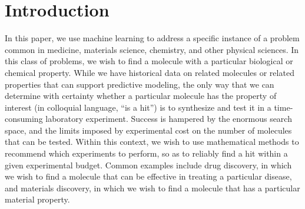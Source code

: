 \documentclass[opre,nonblindrev]{informs3} %
\begin{document}
%


\section{Introduction}

In this paper, we use machine learning to address a specific instance of a problem common in medicine, materials science, chemistry, and other physical sciences.  In this class of problems, we wish to find a molecule with a particular biological or chemical property. While we have historical data on related molecules or related properties that can support predictive modeling, the only way that we can determine with certainty whether a particular molecule has the property of interest (in colloquial language, ``is a hit'') is to synthesize and test it in a time-consuming laboratory experiment. Success is hampered by the enormous search space, and the limits imposed by experimental cost on the number of molecules that can be tested.  Within this context, we wish to use mathematical methods to recommend which experiments to perform, so as to reliably find a hit within a given experimental budget. Common examples include drug discovery, in which we wish to find a molecule that can be effective in treating a particular disease, and materials discovery, in which we wish to find a molecule that has a particular material property.
\end{document}
